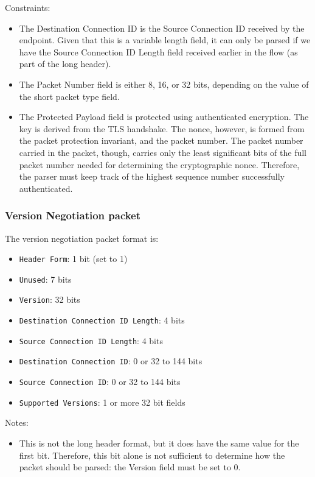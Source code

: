 \documentclass[10pt,a4paper]{article}
\begin{document}
Constraints:
\begin{itemize}
\item The Destination Connection ID is the Source Connection ID received by the endpoint.
Given that this is a variable length field, it can only be parsed if we have the 
Source Connection ID Length field received earlier in the flow (as part of the long
header). 
\item The Packet Number field is either 8, 16, or 32 bits, depending on the value of the
short packet type field.
\item The Protected Payload field is protected using authenticated encryption. The key is
derived from the TLS handshake. The nonce, however, is formed from the packet protection
invariant, and the packet number. The packet number carried in the packet, though, carries
only the least significant bits of the full packet number needed for determining the
cryptographic nonce. Therefore, the parser must keep track of the highest sequence
number successfully authenticated.
\end{itemize}

\subsubsection*{Version Negotiation packet}

The version negotiation packet format is:
\begin{itemize}
\item \texttt{Header Form}: 1 bit (set to 1)
\item \texttt{Unused}: 7 bits
\item \texttt{Version}: 32 bits
\item \texttt{Destination Connection ID Length}: 4 bits
\item \texttt{Source Connection ID Length}: 4 bits
\item \texttt{Destination Connection ID}: 0 or 32 to 144 bits
\item \texttt{Source Connection ID}: 0 or 32 to 144 bits
\item \texttt{Supported Versions}: 1 or more 32 bit fields
\end{itemize}

Notes:
\begin{itemize}
\item This is not the long header format, but it does have the same value for the first
bit. Therefore, this bit alone is not sufficient to determine how the packet should be
parsed: the Version field must be set to 0.
\end{itemize}
\end{document}
